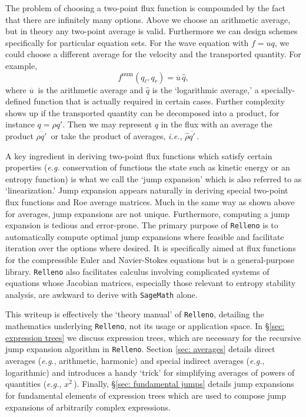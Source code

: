 \documentclass[10pt]{article}
\newcommand{\num}{\mathrm{num}}
\newcommand{\avg}[1]{\overline{#1}\,}
\newcommand{\logavg}[1]{\widehat{#1}}
\newcommand{\Relleno}{\texttt{Relleno}}
\newcommand{\sage}{\texttt{SageMath}}
\begin{document}
The problem of choosing a two-point flux function is compounded by the fact that there are infinitely many options.
Above we choose an arithmetic average, but in theory any two-point average is valid.
Furthermore we can design schemes specifically for particular equation sets.
For the wave equation with $f=uq$, we could choose a different average for the velocity and the transported quantity.
For example,
\begin{equation}
	f^\num(q_\ell,q_r) = \avg{u}\logavg{q},
\end{equation}
where $\avg{u}$ is the arithmetic average and $\logavg{q}$ is the `logarithmic average,' a specially-defined function that is actually required in certain cases.
Further complexity shows up if the transported quantity can be decomposed into a product, for instance $q=\rho q'$.
Then we may represent $q$ in the flux with an average the product $\avg{\rho q'}$ or take the product of averages, \emph{i.e.}, $\logavg{\rho}\avg{q'}$.

A key ingredient in deriving two-point flux functions which satisfy certain properties (\emph{e.g.} conservation of functions the state such as kinetic energy or an entropy function) is what we call the `jump expansion' which is also referred to as `linearization.'
Jump expansion appears naturally in deriving special two-point flux functions and Roe average matrices.
Much in the same way as shown above for averages, jump expansions are not unique.
Furthermore, computing a jump expansion is tedious and error-prone.
The primary purpose of \Relleno{} is to automatically compute optimal jump expansions where feasible and facilitate iteration over the options where desired.
It is specifically aimed at flux functions for the compressible Euler and Navier-Stokes equations but is a general-purpose library.
\Relleno{} also facilitates calculus involving complicated systems of equations whose Jacobian matrices, especially those relevant to entropy stability analysis, are awkward to derive with \sage{} alone.

This writeup is effectively the `theory manual' of \Relleno{}, detailing the mathematics underlying \Relleno{}, not its usage or application space.
In \S\ref{sec: expression trees} we discuss expression trees, which are necessary for the recursive jump expansion algorithm in \Relleno{}.
Section \ref{sec: averages} details direct averages (\emph{e.g.}, arithmetic, harmonic) and special indirect averages (\emph{e.g.}, logarithmic) and introduces a handy `trick' for simplifying averages of powers of quantities (\emph{e.g.}, $\avg{x^2}$).
Finally, \S\ref{sec: fundamental jumps} details jump expansions for fundamental elements of expression trees which are used to compose jump expansions of arbitrarily complex expressions.
\end{document}
